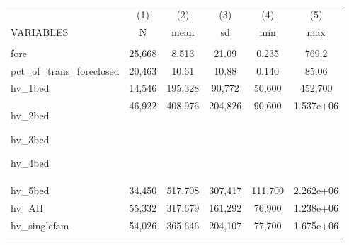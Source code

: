 \begin{tabular}{lccccc} \hline
 & (1) & (2) & (3) & (4) & (5) \\
VARIABLES & N & mean & sd & min & max \\ \hline
 &  &  &  &  &  \\

fore & 25,668 & 8.513 & 21.09 & 0.235 & 769.2 \\
pct\_of\_trans\_foreclosed & 20,463 & 10.61 & 10.88 & 0.140 & 85.06 \\

hv\_1bed & 14,546 & 195,328 & 90,772 & 50,600 & 452,700 \\

hv\_2bed 

hv\_3bed 

hv\_4bed & 46,922 & 408,976 & 204,826 & 90,600 & 1.537e+06 \\

hv\_5bed & 34,450 & 517,708 & 307,417 & 111,700 & 2.262e+06 \\

hv\_AH & 55,332 & 317,679 & 161,292 & 76,900 & 1.238e+06 \\


hv\_singlefam & 54,026 & 365,646 & 204,107 & 77,700 & 1.675e+06 \\


 &  &  &  &  &  \\ \hline
\end{tabular}
